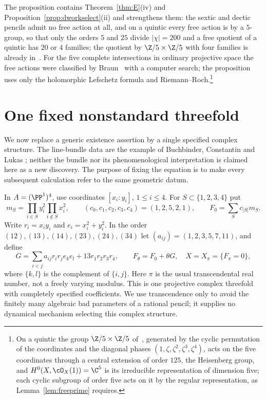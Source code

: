 The proposition contains Theorem~\ref{thm:E}(iv) and
Proposition~\ref{prop:dworkselect}(ii) and strengthens them: the sextic and
dectic pencils admit no free action at all, and on a quintic every free
action is by a $5$-group, so that only the orders $5$ and $25$ divide
$|\chi|=200$ and a free quotient of a quintic has $20$ or $4$ families;
the quotient by $\Z/5\times\Z/5$ with four families is already
in~\cite{CHSW85}. For the five complete intersections in ordinary
projective space the free actions were classified by Braun~\cite{Bra11}
with a computer search; the proposition uses only the holomorphic
Lefschetz formula and Riemann--Roch.\footnote{On a quintic the group
$\Z/5\times\Z/5$ of~\cite{CHSW85}, generated by the cyclic permutation of
the coordinates and the diagonal phases $(1,\zeta,\zeta^2,\zeta^3,\zeta^4)$,
acts on the five coordinates through a central extension of order $125$,
the Heisenberg group, and $H^0(X,\cO_X(1))=\C^5$ is its irreducible
representation of dimension five; each cyclic subgroup of order five acts on
it by the regular representation, as Lemma~\ref{lem:freeprime} requires.}



\section{One fixed nonstandard threefold}\label{sec:fixed}
We now replace a generic existence assertion by a single specified
complex structure. The line-bundle data are the example of Buchbinder,
Constantin and Lukas \cite[Section~5.1]{BCL}; neither the bundle nor its
phenomenological interpretation is claimed here as a new discovery.
The purpose of fixing the equation is to make every subsequent calculation
refer to the same geometric datum.

In $A=(\PP^1)^4$, use coordinates $[x_i:y_i]$, $1\le i\le4$.
For $S\subset\{1,2,3,4\}$ put
\[
 m_S=\prod_{i\in S}y_i^2\prod_{i\notin S}x_i^2,
 \qquad (c_0,c_1,c_2,c_3,c_4)=(1,2,5,2,1),
 \qquad F_0=\sum_S c_{|S|}m_S.
\]
Write $r_i=x_i y_i$ and $e_i=x_i^2+y_i^2$. In the order
$(12),(13),(14),(23),(24),(34)$ let
$(a_{ij})=(1,2,3,5,7,11)$, and define
\begin{equation}\label{eq:fixedpencil}
 G=\sum_{i<j}a_{ij}r_i r_j e_k e_l+13r_1r_2r_3r_4,
 \qquad F_\theta=F_0+\theta G,
 \quad X=X_\pi=\{F_\pi=0\},
\end{equation}
where $\{k,l\}$ is the complement of $\{i,j\}$.
Here $\pi$ is the usual transcendental real number, not a freely varying
modulus. This is one projective complex threefold with completely specified
coefficients. We use transcendence only to avoid the finitely many
algebraic bad parameters of a rational pencil; it supplies no dynamical
mechanism selecting this complex structure.

